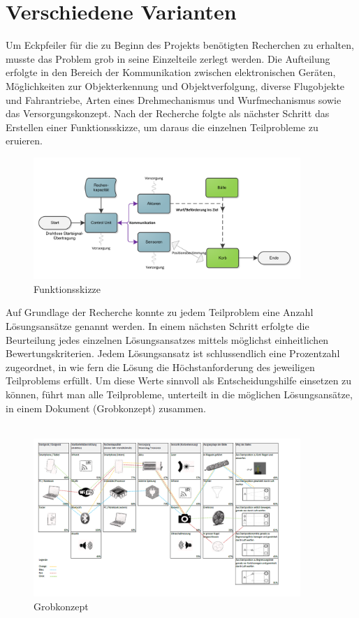 \section{Verschiedene Varianten}
Um Eckpfeiler für die zu Beginn des Projekts benötigten Recherchen zu erhalten, musste das Problem grob in seine Einzelteile zerlegt werden. Die Aufteilung erfolgte in den Bereich der Kommunikation zwischen elektronischen Geräten, Möglichkeiten zur Objekterkennung und Objektverfolgung, diverse Flugobjekte und Fahrantriebe, Arten eines Drehmechanismus und Wurfmechanismus sowie das Versorgungskonzept. 
Nach der Recherche folgte als nächster Schritt das Erstellen einer Funktionsskizze, um daraus die einzelnen Teilprobleme zu eruieren.
\begin{figure}[h!]
	\centering
	\includegraphics[width=0.9\textwidth]{Enddokumentation/Varianten/Bilder/Funktionsskizze.png}
	\caption{Funktionsskizze}
	\label{fig:Funktionsskizze}
\end{figure}
Auf Grundlage der Recherche konnte zu jedem Teilproblem eine Anzahl Lösungsansätze genannt werden. In einem nächsten Schritt erfolgte die Beurteilung jedes einzelnen Lösungsansatzes mittels möglichst einheitlichen Bewertungskriterien. Jedem Lösungsansatz ist schlussendlich eine Prozentzahl zugeordnet, in wie fern die Lösung die Höchstanforderung des jeweiligen Teilproblems erfüllt. Um diese Werte sinnvoll als Entscheidungshilfe einsetzen zu können, führt man alle Teilprobleme, unterteilt in die möglichen Lösungsansätze, in einem Dokument (Grobkonzept) zusammen. \\
\\
\begin{figure}
	\centering
	\includegraphics[width=0.9\textwidth]{Enddokumentation/Varianten/Bilder/Grobkonzept.png}
	\caption{Grobkonzept}
	\label{fig:Grobkonzept}
\end{figure}
